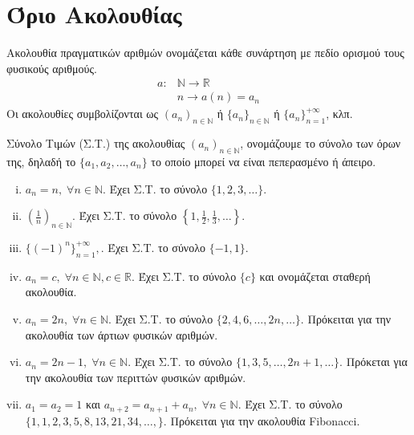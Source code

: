 \documentclass[main.tex]{subfiles}
\begin{document}
\section{Όριο Ακολουθίας}

\begin{dfn}
    Ακολουθία πραγματικών αριθμών ονομάζεται κάθε συνάρτηση με πεδίο ορισμού 
    τους φυσικούς αριθμούς. 
    \begin{align*}
        a \colon &\mathbb{N} \to \mathbb{R} \\
                 &n \to a(n)=a_{n}
    \end{align*} 
    Οι ακολουθίες συμβολίζονται ως $ (a_{n})_{n \in \mathbb{N}} $  
    ή $ \{ a_{n} \} _{n \in \mathbb{N}} $  ή $ \{ a_{n} \} _{n=1}^{+\infty} $, κλπ.
\end{dfn}

\begin{dfn}
    Σύνολο Τιμών (Σ.Τ.) της ακολουθίας $ (a_{n})_{n \in \mathbb{N}} $, ονομάζουμε 
    το σύνολο των όρων της, δηλαδή το $ \{ a_{1}, a_{2}, \ldots, a_{n} \} $ το οποίο μπορεί 
    να είναι πεπερασμένο ή άπειρο.
\end{dfn}

\begin{examples}
\item {}
    \begin{enumerate}[i)]
        \item $ a_{n} = n, \; \forall n \in \mathbb{N} $. Έχει Σ.Τ. το σύνολο 
            $  \{ 1,2,3, \ldots \} $.
        \item $\left(\frac{1}{n}\right)_{n \in \mathbb{N}} $. Έχει Σ.Τ. το σύνολο 
            $  \left\{ 1, \frac{1}{2}, \frac{1}{3}, \ldots \right\} $.
        \item $ \{(-1)^{n}\}_{n=1}^{+ \infty}, $. Έχει Σ.Τ. 
            το σύνολο $ \{ -1,1 \} $.
        \item $ a_{n} = c, \; \forall n \in \mathbb{N}, c \in \mathbb{R} $.
            Έχει Σ.Τ. το σύνολο $ \{ c \} $ και ονομάζεται σταθερή ακολουθία.
        \item $ a_{n}=2n, \; \forall n \in \mathbb{N} $. Έχει Σ.Τ. το σύνολο 
            $ \{ 2,4,6, \ldots, 2n, \ldots \} $. Πρόκειται για την ακολουθία 
            των άρτιων φυσικών αριθμών.
        \item $ a_{n}= 2n-1, \; \forall n \in \mathbb{N} $. Έχει Σ.Τ. το 
            σύνολο $ \{ 1,3,5, \ldots, 2n+1, \ldots \} $. Πρόκεται για την 
            ακολουθία των περιττών φυσικών αριθμών.
        \item \label{ex:anadr} $ a_{1}= a_{2} = 1 $ και $ a_{n+2}=a_{n+1}+a_{n}, \; 
            \forall n \in \mathbb{N}$. Έχει Σ.Τ. το σύνολο $ \{ 1,1,2,3,5,8,
            13,21,34, \ldots,\} $. Πρόκειται για την ακολουθία Fibonacci. 
    \end{enumerate}
\end{examples}
\end{document}

